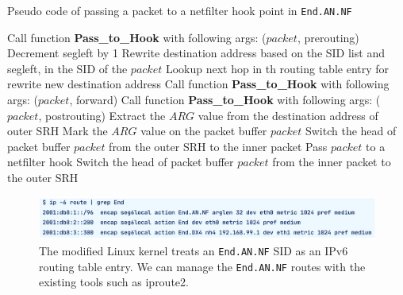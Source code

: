   \begin{algorithm*}[t]
    \caption{Pseudo code of passing a packet to a netfilter hook point in \texttt{End.AN.NF}}
    \small
    \label{alg:end-an-nf}
    \begin{algorithmic}[1]
      \State Call function \textbf{Pass\_to\_Hook} with following args: ($packet$, prerouting)
      \State Decrement segleft by 1
      \State Rewrite destination address based on the SID list and segleft, in the SID of the $packet$
      \State Lookup next hop in th routing table entry for rewrite new destination address
      \State Call function \textbf{Pass\_to\_Hook} with following args: ($packet$, forward)
      \State Call function \textbf{Pass\_to\_Hook} with following args: ($packet$, postrouting)
      \EndFunction
      \fi
      \State Extract the $ARG$ value from the destination address of outer SRH
      \State Mark the $ARG$ value on the packet buffer $packet$
      \EndIf
      \State Switch the head of packet buffer $packet$ from the outer SRH to the inner packet
      \State Pass $packet$ to a netfilter hook
      \State Switch the head of packet buffer $packet$ from the inner packet to the outer SRH
      \EndFunction
    \end{algorithmic}
  \end{algorithm*}
  
  \begin{figure}[t]
    \centering
    \includegraphics[width=0.95\linewidth]{img/End-FW-show-route.pdf}
    \caption{The modified Linux kernel treats an \texttt{End.AN.NF} SID as an IPv6 routing table entry. We can manage the \texttt{End.AN.NF} routes with the existing tools such as iproute2.}
    \label{fig:show-route}
  \end{figure}

